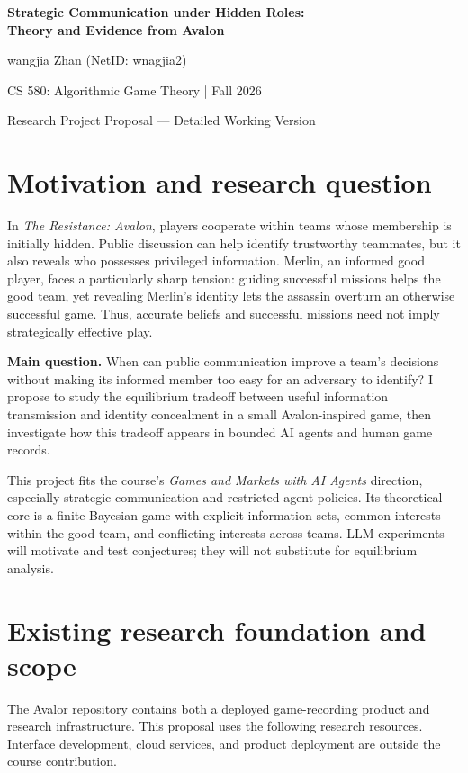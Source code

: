 \documentclass[11pt,letterpaper]{article}
\newcommand{\projectauthor}{wangjia Zhan \quad (NetID: wnagjia2)}
\begin{document}
\begin{center}
{\Large\bfseries Strategic Communication under Hidden Roles:\\[3pt]
Theory and Evidence from Avalon}\par
\vspace{5pt}
{\projectauthor}\par
{CS 580: Algorithmic Game Theory \quad | \quad Fall 2026}\par
{Research Project Proposal --- Detailed Working Version}
\end{center}
\vspace{-5pt}

\section{Motivation and research question}
In \emph{The Resistance: Avalon}, players cooperate within teams whose membership is initially hidden. Public discussion can help identify trustworthy teammates, but it also reveals who possesses privileged information. Merlin, an informed good player, faces a particularly sharp tension: guiding successful missions helps the good team, yet revealing Merlin's identity lets the assassin overturn an otherwise successful game. Thus, accurate beliefs and successful missions need not imply strategically effective play.

\textbf{Main question.} When can public communication improve a team's decisions without making its informed member too easy for an adversary to identify? I propose to study the equilibrium tradeoff between useful information transmission and identity concealment in a small Avalon-inspired game, then investigate how this tradeoff appears in bounded AI agents and human game records.

This project fits the course's \emph{Games and Markets with AI Agents} direction, especially strategic communication and restricted agent policies. Its theoretical core is a finite Bayesian game with explicit information sets, common interests within the good team, and conflicting interests across teams. LLM experiments will motivate and test conjectures; they will not substitute for equilibrium analysis.

\section{Existing research foundation and scope}
The Avalor repository contains both a deployed game-recording product and research infrastructure. This proposal uses the following research resources. Interface development, cloud services, and product deployment are outside the course contribution.
\end{document}
